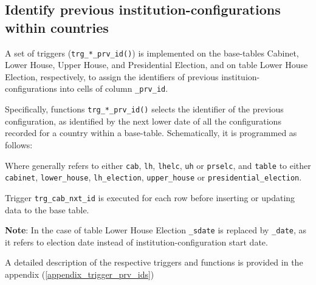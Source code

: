 \subsection{Identify previous institution-configurations within countries}\label{trg_prv_ids}
A set of triggers (\texttt{\footnotesize trg\_*\_prv\_id()}) is implemented on the base-tables Cabinet, Lower House, Upper House, and Presidential Election, and on table Lower House Election, respectively, to assign the identifiers of previous instituion-configurations into cells of column \texttt{\footnotesize *\_prv\_id}.

Specifically, functions \texttt{\footnotesize trg\_*\_prv\_id()} selects the identifier of the previous  configuration, as identified by the next lower date of all the configurations recorded for a country within a base-table.
Schematically, it is programmed as follows:
% 

Where generally \texttt{\footnotesize *} refers to either \texttt{\footnotesize cab}, \texttt{\footnotesize lh}, \texttt{\footnotesize lhelc}, \texttt{\footnotesize uh} or \texttt{\footnotesize prselc}, and \texttt{\footnotesize *table} to either \texttt{\footnotesize cabinet}, \texttt{\footnotesize lower\_house}, \texttt{\footnotesize lh\_election}, \texttt{\footnotesize upper\_house} or \texttt{\footnotesize presidential\_election}.

Trigger \texttt{\footnotesize trg\_cab\_nxt\_id} is executed for each row before inserting or updating data to the base table.

{\bf Note}: In the case of table Lower House Election \texttt{\footnotesize \_sdate} is replaced by \texttt{\footnotesize \_date}, as it refers to election date instead of institution-configuration start date.

A detailed description of the respective triggers and functions is provided in the appendix (\ref{appendix_trigger_prv_ids})




